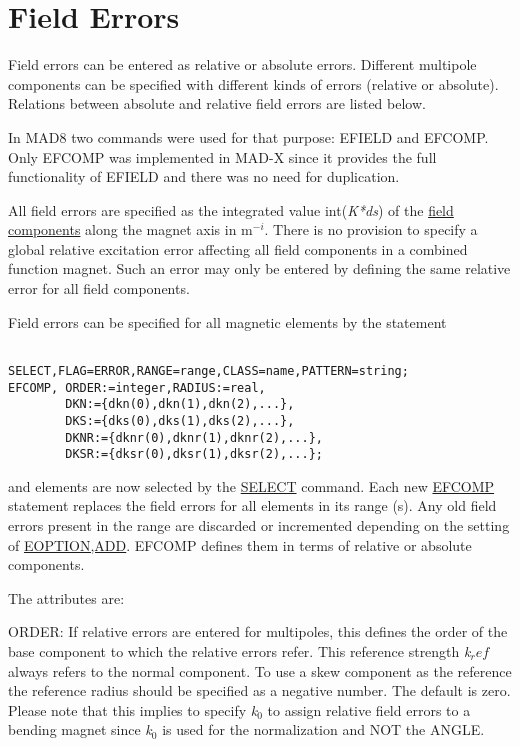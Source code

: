 



\section{Field Errors}  Field errors can be entered as relative or absolute errors. Different multipole components can be specified with different kinds of errors (relative or absolute). Relations between absolute and relative field errors are listed below. 

 In MAD8 two commands were used for that purpose: EFIELD and EFCOMP. Only EFCOMP was implemented in MAD-X since it provides the full functionality of EFIELD and there was no need for duplication. 

 All field errors are specified as the integrated value int(\textit{K*ds}) of the \href{../Introduction/sign_convent.html}{field components} along the magnet axis in m$^{-i}$. There is no provision to specify a global relative excitation error affecting all field components in a combined function magnet. Such an error may only be entered by defining the same relative error for all field components. 

 Field errors can be specified for all magnetic elements by the statement 
\begin{verbatim}

SELECT,FLAG=ERROR,RANGE=range,CLASS=name,PATTERN=string;
EFCOMP, ORDER:=integer,RADIUS:=real,
        DKN:={dkn(0),dkn(1),dkn(2),...},
        DKS:={dks(0),dks(1),dks(2),...},
        DKNR:={dknr(0),dknr(1),dknr(2),...},
        DKSR:={dksr(0),dksr(1),dksr(2),...};
\end{verbatim} and elements are now selected by the \href{../Introduction/select.html}{SELECT} command. Each new \href{efcomp}{EFCOMP} statement replaces the field errors for all elements in its range (s). Any old field errors present in the range are discarded or incremented depending on the setting of  \href{error_option.html}{EOPTION,ADD}. EFCOMP defines them in terms of relative or absolute components. 

 The attributes are: 

ORDER: If relative errors are entered for multipoles, this defines the order of the base component to which the relative  errors refer. This reference strength \textit{k$_ref$} always refers to the normal component. To use a skew component as the reference the reference radius should be specified as a negative number. The default is zero. 
 Please note that this implies to specify \textit{k$_0$} to assign relative field errors to a bending magnet since \textit{k$_0$} is used for the normalization and NOT the ANGLE. 

